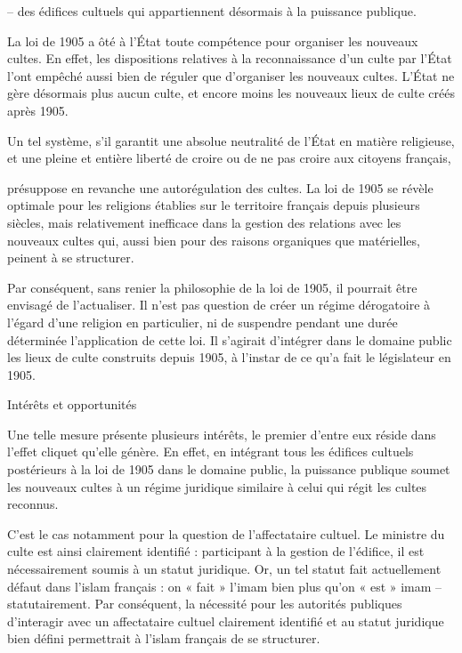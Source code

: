 -- des édifices cultuels qui appartiennent désormais à la puissance
publique.

La loi de 1905 a ôté à l'État toute compétence pour organiser les
nouveaux cultes. En effet, les dispositions relatives à la
reconnaissance d'un culte par l'État l'ont empêché aussi bien de réguler
que d'organiser les nouveaux cultes. L'État ne gère désormais plus aucun
culte, et encore moins les nouveaux lieux de culte créés après 1905.

Un tel système, s'il garantit une absolue neutralité de l'État en
matière religieuse, et une pleine et entière liberté de croire ou de ne
pas croire aux citoyens français,



présuppose en revanche une autorégulation des cultes. La loi de 1905 se
révèle optimale pour les religions établies sur le territoire français
depuis plusieurs siècles, mais relativement inefficace dans la gestion
des relations avec les nouveaux cultes qui, aussi bien pour des raisons
organiques que matérielles, peinent à se structurer.

Par conséquent, sans renier la philosophie de la loi de 1905, il
pourrait être envisagé de l'actualiser. Il n'est pas question de créer
un régime dérogatoire à l'égard d'une religion en particulier, ni de
suspendre pendant une durée déterminée l'application de cette loi. Il
s'agirait d'intégrer dans le domaine public les lieux de culte
construits depuis 1905, à l'instar de ce qu'a fait le législateur en
1905.


Intérêts et opportunités


Une telle mesure présente plusieurs intérêts, le premier d'entre eux
réside dans l'effet cliquet qu'elle génère. En effet, en intégrant tous
les édifices cultuels postérieurs à la loi de 1905 dans le domaine
public, la puissance publique soumet les nouveaux cultes à un régime
juridique similaire à celui qui régit les cultes reconnus.

C'est le cas notamment pour la question de l'affectataire cultuel. Le
ministre du culte est ainsi clairement identifié : participant à la
gestion de l'édifice, il est nécessairement soumis à un statut
juridique. Or, un tel statut fait actuellement défaut dans l'islam
français : on « fait » l'imam bien plus qu'on « est » imam --
statutairement. Par conséquent, la nécessité pour les autorités
publiques d'interagir avec un affectataire cultuel clairement identifié
et au statut juridique bien défini permettrait à l'islam français de se
structurer.

